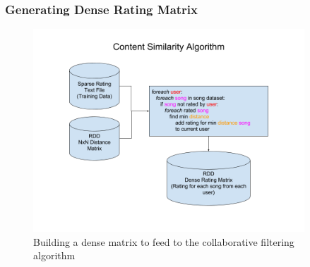 \documentclass[11pt]{beamer}
\begin{document}
  \begin{frame}
    \frametitle{Generating Dense Rating Matrix}
    \begin{figure}[h]
      \centering
      \includegraphics[width=4in]{figures/content_similarity_algorithm.png}
      \caption{Building a dense matrix to feed to the collaborative filtering algorithm}
      \label{fig:content_similarity_algorithm}
    \end{figure}
  \end{frame}
  
\end{document}
